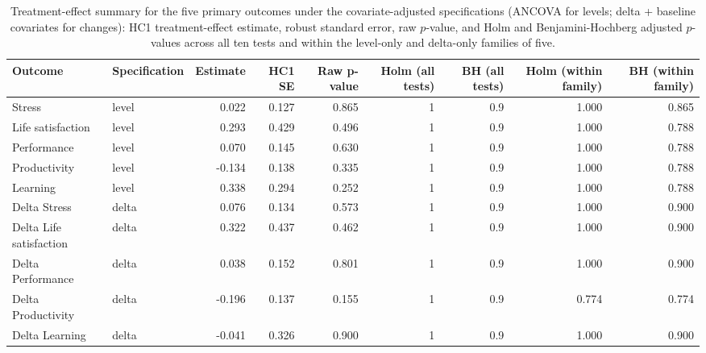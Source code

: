 \begin{table}

\caption{\label{tab:mt-correction}Treatment-effect summary for the five primary outcomes under the covariate-adjusted specifications (ANCOVA for levels; delta + baseline covariates for changes): HC1 treatment-effect estimate, robust standard error, raw $p$-value, and Holm and Benjamini-Hochberg adjusted $p$-values across all ten tests and within the level-only and delta-only families of five.}
\centering
\begin{tabular}[t]{llrrrrrrr}
\toprule
Outcome & Specification & Estimate & HC1 SE & Raw p-value & Holm (all tests) & BH (all tests) & Holm (within family) & BH (within family)\\
\midrule
Stress & level & 0.022 & 0.127 & 0.865 & 1 & 0.9 & 1.000 & 0.865\\
Life satisfaction & level & 0.293 & 0.429 & 0.496 & 1 & 0.9 & 1.000 & 0.788\\
Performance & level & 0.070 & 0.145 & 0.630 & 1 & 0.9 & 1.000 & 0.788\\
Productivity & level & -0.134 & 0.138 & 0.335 & 1 & 0.9 & 1.000 & 0.788\\
Learning & level & 0.338 & 0.294 & 0.252 & 1 & 0.9 & 1.000 & 0.788\\
Delta Stress & delta & 0.076 & 0.134 & 0.573 & 1 & 0.9 & 1.000 & 0.900\\
Delta Life satisfaction & delta & 0.322 & 0.437 & 0.462 & 1 & 0.9 & 1.000 & 0.900\\
Delta Performance & delta & 0.038 & 0.152 & 0.801 & 1 & 0.9 & 1.000 & 0.900\\
Delta Productivity & delta & -0.196 & 0.137 & 0.155 & 1 & 0.9 & 0.774 & 0.774\\
Delta Learning & delta & -0.041 & 0.326 & 0.900 & 1 & 0.9 & 1.000 & 0.900\\
\bottomrule
\end{tabular}
\end{table}
